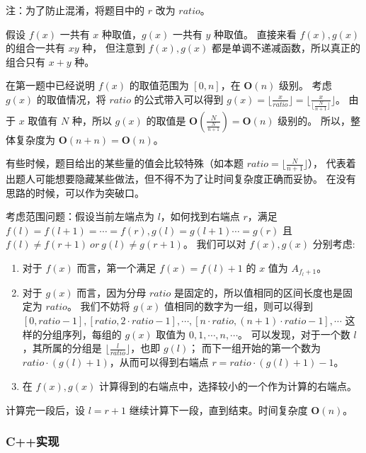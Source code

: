 注：为了防止混淆，将题目中的 $r$ 改为 $ratio$。

假设 $f(x)$ 一共有 $x$ 种取值，$g(x)$ 一共有 $y$ 种取值。
直接来看 $f(x),g(x)$ 的组合一共有 $xy$ 种，
但注意到 $f(x),g(x)$ 都是单调不递减函数，所以真正的组合只有 $x+y$ 种。

在第一题中已经说明 $f(x)$ 的取值范围为 $[0,n]$，在 $\mathbf{O}(n)$ 级别。
考虑 $g(x)$ 的取值情况，将 $ratio$ 的公式带入可以得到 $g(x)=\lfloor \frac{x}{ratio}\rfloor=\lfloor\frac{x}{\lfloor \frac{N}{n+1}\rfloor}\rfloor$。
由于 $x$ 取值有 $N$ 种，所以 $g(x)$ 的取值是 $\mathbf{O}(\frac{N}{\frac{N}{n+1}})=\mathbf{O}(n)$ 级别的。
所以，整体复杂度为 $\mathbf{O}(n+n)=\mathbf{O}(n)$。

\begin{note}
有些时候，题目给出的某些量的值会比较特殊（如本题 $ratio=\lfloor\frac{N}{n+1}\rfloor$），
代表着出题人可能想要隐藏某些做法，但不得不为了让时间复杂度正确而妥协。
在没有思路的时候，可以作为突破口。
\end{note}

考虑范围问题：假设当前左端点为 $l$，如何找到右端点 $r$，满足 $f(l)=f(l+1)=\cdots=f(r),g(l)=g(l+1)\cdots=g(r)$ 且 $f(l)\not=f(r+1)\ or\ g(l)\not=g(r+1)$。
我们可以对 $f(x),g(x)$ 分别考虑:

\begin{enumerate}
    \item 对于 $f(x)$ 而言，第一个满足 $f(x)=f(l)+1$ 的 $x$ 值为 $A_{f_l + 1}$。
    \item 对于 $g(x)$ 而言，因为分母 $ratio$ 是固定的，所以值相同的区间长度也是固定为 $ratio$。
    我们不妨将 $g(x)$ 值相同的数字为一组，则可以得到 $[0,ratio-1],[ratio,2\cdot ratio-1],\cdots,[n\cdot ratio,(n+1)\cdot ratio-1],\cdots$ 
    这样的分组序列，每组的 $g(x)$ 取值为 $0,1,\cdots,n,\cdots$。
    可以发现，对于一个数 $l$，其所属的分组是 $\lfloor \frac{l}{ratio}\rfloor$，也即 $g(l)$；
    而下一组开始的第一个数为 $ratio\cdot (g(l)+1)$，从而可以得到右端点 $r = ratio\cdot (g(l)+1) - 1$。
    \item 在 $f(x),g(x)$ 计算得到的右端点中，选择较小的一个作为计算的右端点。
\end{enumerate}

计算完一段后，设 $l=r+1$ 继续计算下一段，直到结束。时间复杂度 $\mathbf{O}(n)$。

\subsubsection{C++实现}



